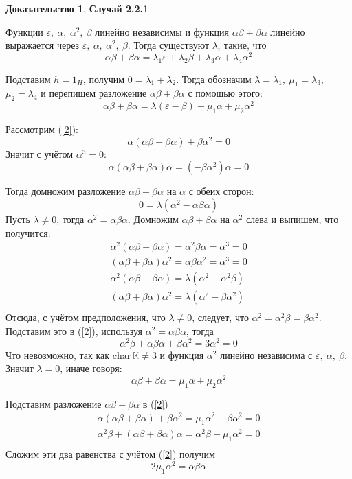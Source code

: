 \documentclass[a4paper, 12pt]{article}
\theoremstyle{definition}
\newtheorem*{prof}{\hspace*{\parindent}Доказательство}
\begin{document}
\begin{prof}
    \textbf{Случай 2.2.1}

    Функции $\varepsilon,\ \alpha,\ \alpha^2,\ \beta$ линейно независимы и функция $\alpha\beta+\beta\alpha$ линейно выражается через $\varepsilon,\ \alpha,\ \alpha^2,\ \beta$.
    Тогда существуют $\lambda_i$ такие, что \[
    \alpha\beta+\beta\alpha = \lambda_1\varepsilon+\lambda_2\beta +\lambda_3\alpha+\lambda_4\alpha^2
     \]

    Подставим $h = 1_H$, получим $0 = \lambda_1+\lambda_2$. Тогда обозначим $\lambda = \lambda_1,\ {\mu_1 = \lambda_3,}$ ${\mu_2 = \lambda_4}$ и перепишем разложение $\alpha\beta+\beta\alpha$ с помощью этого: \[
    \alpha\beta+\beta\alpha = \lambda(\varepsilon-\beta)+\mu_1\alpha+\mu_2\alpha^2
    \]

    Рассмотрим (\ref{2}): 
    \[
    \alpha(\alpha\beta+\beta\alpha)+\beta\alpha^2 = 0
    \]
    Значит с учётом $\alpha^3 =0$: \[
    \alpha(\alpha\beta+\beta\alpha)\alpha = (-\beta\alpha^2)\alpha = 0
    \]

    Тогда домножим разложение $\alpha\beta+\beta\alpha$ на $\alpha$ с обеих сторон:\[
    0 = \lambda(\alpha^2-\alpha\beta\alpha)
    \]
    Пусть $\lambda \neq 0$, тогда $\alpha^2 = \alpha\beta\alpha$. Домножим $\alpha\beta+\beta\alpha$ на $\alpha^2$ слева и выпишем, что получится:
    \begin{eqnarray*}
        \alpha^2(\alpha\beta+\beta\alpha) = \alpha^2\beta\alpha= \alpha^3 = 0\\
        (\alpha\beta+\beta\alpha)\alpha^2= \alpha\beta\alpha^2 = \alpha^3 = 0\\
        \alpha^2(\alpha\beta+\beta\alpha) = \lambda(\alpha^2 - \alpha^2\beta)\\
        (\alpha\beta+\beta\alpha)\alpha^2 = \lambda(\alpha^2 - \beta\alpha^2)\\
    \end{eqnarray*}
    Отсюда, с учётом предположения, что $\lambda\neq 0$, следует, что $\alpha^2 = \alpha^2\beta= \beta\alpha^2$. Подставим это в (\ref{2}), используя $\alpha^2 = \alpha\beta\alpha$, тогда
    \[
        \alpha^2\beta+\alpha\beta\alpha+\beta\alpha^2 = 3\alpha^2=0
    \]
    Что невозможно, так как $\mathrm{char}\ \mathbb{K} \neq 3$ и функция $\alpha^2$ линейно независима с $\varepsilon,\ \alpha,\ \beta$. Значит $\lambda = 0$, иначе говоря: \[
    \alpha\beta+\beta\alpha = \mu_1\alpha+\mu_2\alpha^2
    \]

    Подставим разложение $\alpha\beta+\beta\alpha$ в (\ref{2})
    \begin{eqnarray*}
        \alpha(\alpha\beta+\beta\alpha)+\beta\alpha^2 = \mu_1\alpha^2 + \beta\alpha^2 = 0\\
        \alpha^2\beta+(\alpha\beta+\beta\alpha)\alpha = \alpha^2\beta + \mu_1\alpha^2 = 0\\
    \end{eqnarray*}
    Сложим эти два равенства с учётом (\ref{2}) получим \[
    2\mu_1\alpha^2 = \alpha\beta\alpha
    \]
    

\end{prof}
\end{document}

